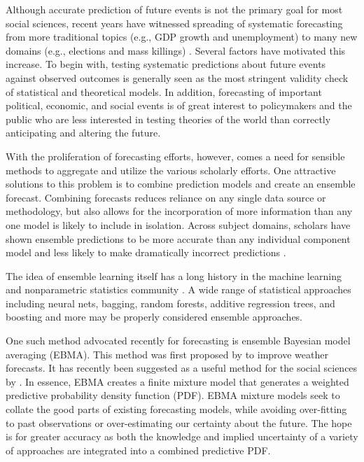 \documentclass[12pt,fullpage,endnotes]{article}
\begin{document}
Although accurate prediction of future events is not the primary goal
for most social sciences, recent years have witnessed spreading of
systematic forecasting from more traditional topics (e.g., GDP growth
and unemployment) to many new domains (e.g., elections and mass
killings) .  Several factors have motivated this increase.  To begin
with, testing systematic predictions about future events against
observed outcomes is generally seen as the most stringent validity
check of statistical and theoretical models.  In addition, forecasting
of important political, economic, and social events is of great
interest to policymakers and the public who are less interested in
testing theories of the world than correctly anticipating and altering
the future.

With the proliferation of forecasting efforts, however, comes a need
for sensible methods to aggregate and utilize the various scholarly
efforts.  One attractive solutions to this problem is to combine
prediction models and create an ensemble forecast.  Combining
forecasts reduces reliance on any single data source or methodology,
but also allows for the incorporation of more information than any one
model is likely to include in isolation.  Across subject domains,
scholars have shown ensemble predictions to be more accurate than any
individual component model and less likely to make dramatically
incorrect predictions \citep{Bates:1969,Armstrong:2001,Raftery:2005}.

The idea of ensemble learning itself has a long history in the machine
learning and nonparametric statistics community \citep{Hastie:2009}. A
wide range of statistical approaches including neural nets, bagging,
random forests, additive regression trees, and boosting and more may
be properly considered ensemble approaches.

One such method advocated recently for forecasting is ensemble
Bayesian model averaging (EBMA). This method was first proposed by
\citet{Raftery:2005} to improve weather forecasts.  It has recently
been suggested as a useful method for the social sciences by
\citet{mhw:2012}. In essence, EBMA creates a finite mixture model that
generates a weighted predictive probability density function (PDF).
EBMA mixture models seek to collate the good parts of existing
forecasting models, while avoiding over-fitting to past observations
or over-estimating our certainty about the future.  The hope is for
greater accuracy as both the knowledge and implied uncertainty of a
variety of approaches are integrated into a combined predictive PDF.
\end{document}
